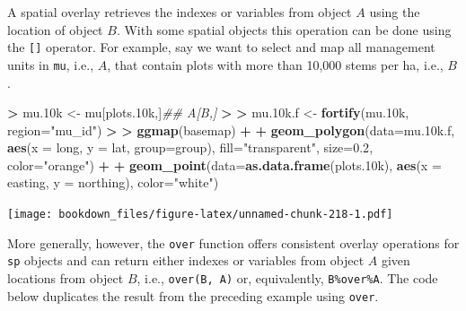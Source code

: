\documentclass[
]{krantz}
\makeatletter
\newenvironment{Shaded}{\begin{snugshade}}{\end{snugshade}}
\newcommand{\CommentTok}[1]{\textcolor[rgb]{0.37,0.37,0.37}{\textit{#1}}}
\newcommand{\DataTypeTok}[1]{\textcolor[rgb]{0.27,0.27,0.27}{#1}}
\newcommand{\ErrorTok}[1]{\textcolor[rgb]{0.14,0.14,0.14}{\textbf{#1}}}
\newcommand{\FloatTok}[1]{\textcolor[rgb]{0.06,0.06,0.06}{#1}}
\newcommand{\KeywordTok}[1]{\textcolor[rgb]{0.27,0.27,0.27}{\textbf{#1}}}
\newcommand{\NormalTok}[1]{#1}
\newcommand{\OperatorTok}[1]{\textcolor[rgb]{0.43,0.43,0.43}{\textbf{#1}}}
\newcommand{\StringTok}[1]{\textcolor[rgb]{0.5,0.5,0.5}{#1}}
\newenvironment{kframe}{%
\medskip{}
\setlength{\fboxsep}{.8em}
 \def\at@end@of@kframe{}%
 \ifinner\ifhmode%
  \def\at@end@of@kframe{\end{minipage}}%
  \begin{minipage}{\columnwidth}%
 \fi\fi%
 \def\FrameCommand##1{\hskip\@totalleftmargin \hskip-\fboxsep
 \colorbox{shadecolor}{##1}\hskip-\fboxsep
     \hskip-\linewidth \hskip-\@totalleftmargin \hskip\columnwidth}%
 \MakeFramed {\advance\hsize-\width
   \@totalleftmargin\z@ \linewidth\hsize
   \@setminipage}}%
 {\par\unskip\endMakeFramed%
 \at@end@of@kframe}
\renewenvironment{Shaded}{\begin{kframe}}{\end{kframe}}
\makeatother
\begin{document}
A spatial overlay retrieves the indexes or variables from object \(A\) using the location of object \(B\). With some spatial objects this operation can be done using the \texttt{{[}{]}} operator. For example, say we want to select and map all management units in \texttt{mu}, i.e., \(A\), that contain plots with more than 10,000 stems per ha, i.e., \(B\).

\begin{Shaded}
\begin{Highlighting}[]
\OperatorTok{\textgreater{}}\StringTok{ }\NormalTok{mu}\FloatTok{.10}\NormalTok{k \textless{}{-}}\StringTok{ }\NormalTok{mu[plots}\FloatTok{.10}\NormalTok{k,]}\CommentTok{\#\# A[B,]}
\OperatorTok{\textgreater{}}\StringTok{ }
\ErrorTok{\textgreater{}}\StringTok{ }\NormalTok{mu}\FloatTok{.10}\NormalTok{k.f \textless{}{-}}\StringTok{ }\KeywordTok{fortify}\NormalTok{(mu}\FloatTok{.10}\NormalTok{k, }\DataTypeTok{region=}\StringTok{"mu\_id"}\NormalTok{)}
\OperatorTok{\textgreater{}}\StringTok{ }
\ErrorTok{\textgreater{}}\StringTok{ }\KeywordTok{ggmap}\NormalTok{(basemap) }\OperatorTok{+}
\OperatorTok{+}\StringTok{     }\KeywordTok{geom\_polygon}\NormalTok{(}\DataTypeTok{data=}\NormalTok{mu}\FloatTok{.10}\NormalTok{k.f, }\KeywordTok{aes}\NormalTok{(}\DataTypeTok{x =}\NormalTok{ long, }\DataTypeTok{y =}\NormalTok{ lat, }\DataTypeTok{group=}\NormalTok{group), }\DataTypeTok{fill=}\StringTok{"transparent"}\NormalTok{, }\DataTypeTok{size=}\FloatTok{0.2}\NormalTok{, }\DataTypeTok{color=}\StringTok{"orange"}\NormalTok{) }\OperatorTok{+}
\OperatorTok{+}\StringTok{     }\KeywordTok{geom\_point}\NormalTok{(}\DataTypeTok{data=}\KeywordTok{as.data.frame}\NormalTok{(plots}\FloatTok{.10}\NormalTok{k), }\KeywordTok{aes}\NormalTok{(}\DataTypeTok{x =}\NormalTok{ easting, }\DataTypeTok{y =}\NormalTok{ northing), }\DataTypeTok{color=}\StringTok{"white"}\NormalTok{)}
\end{Highlighting}
\end{Shaded}

\texttt{[image: bookdown\_files/figure-latex/unnamed-chunk-218-1.pdf]}

More generally, however, the \texttt{over} function offers consistent overlay operations for \texttt{sp} objects and can return either indexes or variables from object \(A\) given locations from object \(B\), i.e., \texttt{over(B,\ A)} or, equivalently, \texttt{B\%over\%A}. The code below duplicates the result from the preceding example using \texttt{over}.

\begin{Shaded}
\end{Shaded}
\end{document}

